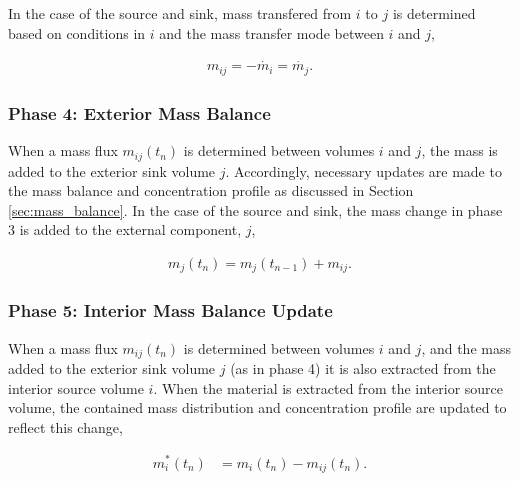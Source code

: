 In the case of the source and sink, mass transfered from $i$ to $j$ is 
determined based on conditions in $i$ and the mass transfer mode between $i$ 
and $j$,

\begin{align}
m_{ij}= -\dot{m_i} = \dot{m_j}.
\end{align}

\subsubsection{Phase 4: Exterior Mass Balance}

When a mass flux $m_{ij}(t_n)$ is determined between volumes $i$ and $j$, the 
mass is added to the exterior sink volume $j$. Accordingly, necessary updates 
are made to the mass balance and concentration profile as discussed in Section 
\ref{sec:mass_balance}. In the case of the source and sink, the mass change in 
phase 3 is added to the external component, $j$,

\begin{align}
 m_j(t_n) = m_j(t_{n-1}) + m_{ij}.
\end{align}

\subsubsection{Phase 5: Interior Mass Balance Update}

When a mass flux $m_{ij}(t_n)$ is determined between volumes $i$ and $j$, and 
the mass added to the exterior sink volume $j$ (as in phase 4) it is also 
extracted from the interior source volume $i$.  When the material is extracted 
from the interior source volume, the contained mass distribution and 
concentration profile are updated to reflect this change,

\begin{align}
  m_{i}^*(t_n) &= m_i(t_n) - m_{ij}(t_n).
\end{align}

